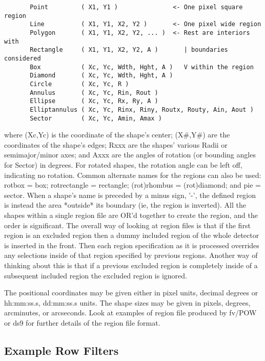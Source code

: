 \documentclass[11pt]{book}
\begin{document}
\begin{verbatim}
       Point         ( X1, Y1 )               <- One pixel square region
       Line          ( X1, Y1, X2, Y2 )       <- One pixel wide region
       Polygon       ( X1, Y1, X2, Y2, ... )  <- Rest are interiors with
       Rectangle     ( X1, Y1, X2, Y2, A )       | boundaries considered
       Box           ( Xc, Yc, Wdth, Hght, A )   V within the region
       Diamond       ( Xc, Yc, Wdth, Hght, A )
       Circle        ( Xc, Yc, R )
       Annulus       ( Xc, Yc, Rin, Rout )
       Ellipse       ( Xc, Yc, Rx, Ry, A )
       Elliptannulus ( Xc, Yc, Rinx, Riny, Routx, Routy, Ain, Aout )
       Sector        ( Xc, Yc, Amin, Amax )
\end{verbatim}
    where (Xc,Yc) is  the coordinate of  the shape's center; (X\#,Y\#) are
    the coordinates  of the shape's edges;  Rxxx are the shapes' various
    Radii or semimajor/minor  axes; and Axxx  are the angles of rotation
    (or bounding angles for Sector) in degrees.  For rotated shapes, the
    rotation angle  can  be left  off, indicating  no rotation.   Common
    alternate  names for the regions  can also be  used: rotbox = box;
    rotrectangle = rectangle;  (rot)rhombus = (rot)diamond;  and pie
    = sector.  When a  shape's name is  preceded by a minus sign, '-',
    the defined region  is instead the area  *outside* its boundary (ie,
    the region is inverted).  All the shapes within a single region
    file are OR'd together to create the region, and the order is
    significant. The overall way of looking at region files is that if
    the first region is an excluded region then a dummy included region
    of the whole detector is inserted in the front. Then each region
    specification as it is processed overrides any selections inside of
    that region specified by previous regions. Another way of thinking
    about this is that if a previous excluded region is completely
    inside of a subsequent included region the excluded region is
    ignored.

    The positional coordinates may be given either in pixel units,
    decimal degrees or hh:mm:ss.s, dd:mm:ss.s units.  The shape sizes
    may be given in pixels, degrees, arcminutes, or arcseconds.  Look
    at examples of region file produced by fv/POW or ds9 for further
    details of the region file format.



\subsection{Example Row Filters}
\end{document}
